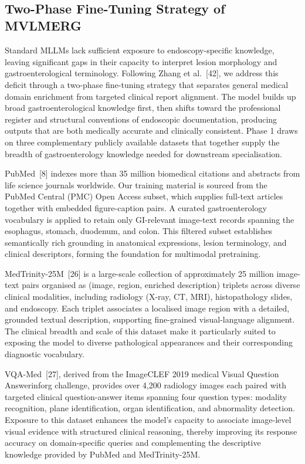 ﻿﻿\documentclass[12pt]{report}
\begin{document}
\subsection{Two-Phase Fine-Tuning Strategy of MVLMERG}
Standard MLLMs lack sufficient exposure to endoscopy-specific knowledge, leaving significant gaps in their capacity to interpret lesion morphology and gastroenterological terminology. Following Zhang et al.~[42], we address this deficit through a two-phase fine-tuning strategy that separates general medical domain enrichment from targeted clinical report alignment. The model builds up broad gastroenterological knowledge first, then shifts toward the professional register and structural conventions of endoscopic documentation, producing outputs that are both medically accurate and clinically consistent.
Phase 1 draws on three complementary publicly available datasets that together supply the breadth of gastroenterology knowledge needed for downstream specialisation.

PubMed~[8] indexes more than 35 million biomedical citations and abstracts from life science journals worldwide. Our training material is sourced from the PubMed Central (PMC) Open Access subset, which supplies full-text articles together with embedded figure-caption pairs. A curated gastroenterology vocabulary is applied to retain only GI-relevant image-text records spanning the esophagus, stomach, duodenum, and colon. This filtered subset establishes semantically rich grounding in anatomical expressions, lesion terminology, and clinical descriptors, forming the foundation for multimodal pretraining.

MedTrinity-25M~[26] is a large-scale collection of approximately 25 million image-text pairs organised as (image, region, enriched description) triplets across diverse clinical modalities, including radiology (X-ray, CT, MRI), histopathology slides, and endoscopy. Each triplet associates a localised image region with a detailed, grounded textual description, supporting fine-grained visual-language alignment. The clinical breadth and scale of this dataset make it particularly suited to exposing the model to diverse pathological appearances and their corresponding diagnostic vocabulary.

VQA-Med~[27], derived from the ImageCLEF 2019 medical Visual Question Answerinforg challenge, provides over 4{,}200 radiology images each paired with targeted clinical question-answer items spanning four question types: modality recognition, plane identification, organ identification, and abnormality detection. Exposure to this dataset enhances the model's capacity to associate image-level visual evidence with structured clinical reasoning, thereby improving its response accuracy on domain-specific queries and complementing the descriptive knowledge provided by PubMed and MedTrinity-25M.
\end{document}
